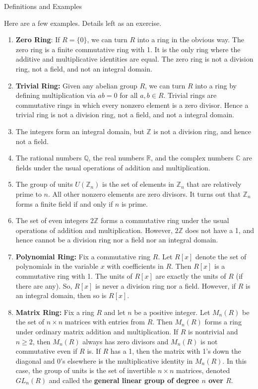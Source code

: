 \begin{section}{Definitions and Examples}
\begin{example}
Here are a few examples.  Details left as an exercise.
\begin{enumerate}[label=\rm{(\alph*)}]
\item \textbf{Zero Ring}: If $R=\{0\}$, we can turn $R$ into a ring in the obvious way.  The zero ring is a finite commutative ring with 1.  It is the only ring where the additive and multiplicative identities are equal.  The zero ring is not a division ring, not a field, and not an integral domain.
\item \textbf{Trivial Ring:} Given any abelian group $R$, we can turn $R$ into a ring by defining multiplication via $ab=0$ for all $a,b\in R$. Trivial rings are commutative rings in which every nonzero element is a zero divisor.  Hence a trivial ring is not a division ring, not a field, and not a integral domain.
\item 
The integers form an integral domain, but $\mathbb{Z}$ is not a division ring, and hence not a field.
\item The rational numbers $\mathbb{Q}$, the real numbers $\mathbb{R}$, and the complex numbers $\mathbb{C}$ are fields under the usual operations of addition and multiplication.
\item 
The group of units $U(\mathbb{Z}_n)$ is the set of elements in $\mathbb{Z}_n$ that are relatively prime to $n$.  All other nonzero elements are zero divisors.  It turns out that $\mathbb{Z}_n$ forms a finite field if and only if $n$ is prime.
\item The set of even integers $2\mathbb{Z}$ forms a commutative ring under the usual operations of addition and multiplication.  However, $2\mathbb{Z}$ does not have a 1, and hence cannot be a division ring nor a field nor an integral domain.
\item \textbf{Polynomial Ring:} Fix a commutative ring $R$.  Let $R[x]$ denote the set of polynomials in the variable $x$ with coefficients in $R$.  Then $R[x]$ is a commutative ring with 1. The units of $R[x]$ are exactly the units of $R$ (if there are any). So, $R[x]$ is never a division ring nor a field.  However, if $R$ is an integral domain, then so is $R[x]$. 
\item \textbf{Matrix Ring:} Fix a ring $R$ and let $n$ be a positive integer.  Let $M_n(R)$ be the set of $n\times n$ matrices with entries from $R$.  Then $M_n(R)$ forms a ring under ordinary matrix addition and multiplication.  If $R$ is nontrivial and $n\geq 2$, then $M_n(R)$ always has zero divisors and $M_n(R)$ is not commutative even if $R$ is.  If $R$ has a 1, then the matrix with 1's down the diagonal and 0's elsewhere is the multiplicative identity in $M_n(R)$.  In this case, the group of units is the set of invertible $n\times n$ matrices, denoted $GL_n(R)$ and called the \textbf{general linear group of degree $n$ over $R$}.

\end{enumerate}
\end{example}
\end{section}
